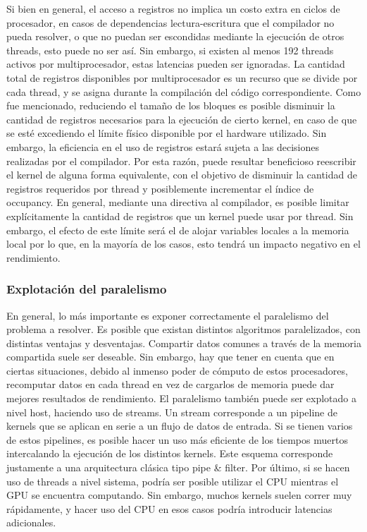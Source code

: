 \documentclass[a4paper,10pt]{report}
\begin{document}
Si bien en general, el acceso a registros no implica un costo extra en ciclos de procesador, en casos de
dependencias lectura-escritura que el compilador no pueda resolver, o que no puedan ser escondidas
mediante la ejecución de otros threads, esto puede no ser así. Sin embargo, si existen al menos 192
threads activos por multiprocesador, estas latencias pueden ser ignoradas.
La cantidad total de registros disponibles por multiprocesador es un recurso que se divide por cada
thread, y se asigna durante la compilación del código correspondiente. Como fue mencionado, reduciendo el tamaño de los bloques es posible disminuir la cantidad de registros necesarios para la ejecución de cierto kernel, en caso de que se esté excediendo el límite físico disponible por el hardware
utilizado. Sin embargo, la eficiencia en el uso de registros estará sujeta a las decisiones realizadas por el
compilador. Por esta razón, puede resultar beneficioso reescribir el kernel de alguna forma equivalente,
con el objetivo de disminuir la cantidad de registros requeridos por thread y posiblemente incrementar
el índice de occupancy. En general, mediante una directiva al compilador, es posible limitar explícitamente la cantidad de registros que un kernel puede usar por thread. Sin embargo, el efecto de este límite
será el de alojar variables locales a la memoria local por lo que, en la mayoría de los casos, esto tendrá
un impacto negativo en el rendimiento.


\subsubsection{Explotación del paralelismo}

En general, lo más importante es exponer correctamente el paralelismo del problema a resolver. Es
posible que existan distintos algoritmos paralelizados, con distintas ventajas y desventajas. Compartir
datos comunes a través de la memoria compartida suele ser deseable. Sin embargo, hay que tener en
cuenta que en ciertas situaciones, debido al inmenso poder de cómputo de estos procesadores, recomputar datos en cada thread en vez de cargarlos de memoria puede dar mejores resultados de rendimiento.
El paralelismo también puede ser explotado a nivel host, haciendo uso de streams. Un stream corresponde a un pipeline de kernels que se aplican en serie a un flujo de datos de entrada. Si se tienen
varios de estos pipelines, es posible hacer un uso más eficiente de los tiempos muertos intercalando la
ejecución de los distintos kernels. Este esquema corresponde justamente a una arquitectura clásica tipo
pipe \& filter.
Por último, si se hacen uso de threads a nivel sistema, podría ser posible utilizar el CPU mientras el
GPU se encuentra computando. Sin embargo, muchos kernels suelen correr muy rápidamente, y hacer
uso del CPU en esos casos podría introducir latencias adicionales.
\end{document}
